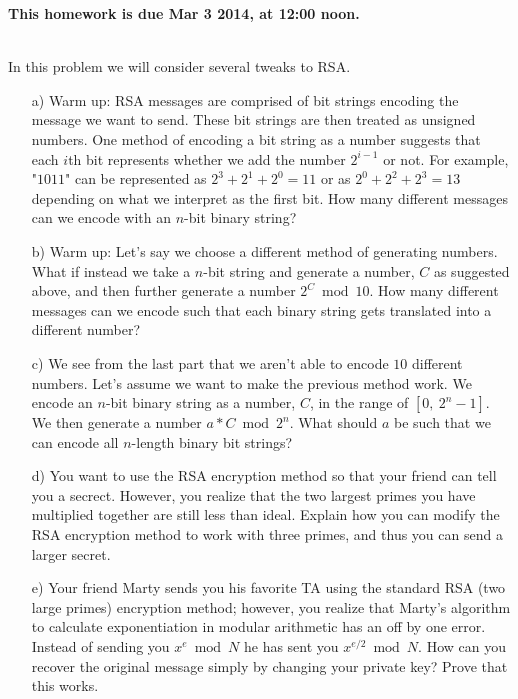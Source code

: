 \documentclass[]{article}
\begin{document}
\maketitle
{}
\vspace{0.5em}
{\Large{\textbf{This homework is due Mar 3 2014, at 12:00 noon.}}}

\begin{qunlist}
  
\\    %
In this problem we will consider several tweaks to RSA.
\begin{itemize}
\qpart
\item [a)] Warm up: RSA messages are comprised of bit strings encoding the message we want to send. These bit strings are then treated as unsigned numbers. One method of encoding a bit string as a number suggests that each $i$th bit represents whether we add the number $2^{i-1}$ or not. For example, "$1011$" can be represented as $2^3 + 2^1 + 2^0 = 11$ or as $2^0 + 2^2 + 2^3 = 13$ depending on what we interpret as the first bit. How many different messages can we encode with an $n$-bit binary string?
\qpart
\item [b)] Warm up: Let's say we choose a different method of generating numbers. What if instead we take a $n$-bit string and generate a number, $C$ as suggested above, and then further generate a number $2^C \bmod 10$. How many different messages can we encode such that each binary string gets translated into a different number?
\qpart
\item [c)] We see from the last part that we aren't able to encode $10$ different numbers. Let's assume we want to make the previous method work. We encode an $n$-bit binary string as a number, $C$, in the range of $[0, \ 2^n -1]$. We then generate a number $a*C \bmod {2^n}$. What should $a$ be such that we can encode all $n$-length binary bit strings?
\qpart
\item [d)] You want to use the RSA encryption method so that your friend can tell you a secrect. However, you realize that the two largest primes you have multiplied together are still less than ideal. Explain how you can modify the RSA encryption method to work with three primes, and thus you can send a larger secret.
\qpart
\item [e)] Your friend Marty sends you his favorite TA using the standard RSA (two large primes) encryption method; however, you realize that Marty's algorithm to calculate exponentiation in modular arithmetic has an off by one error. Instead of sending you $x^e \bmod{N}$ he has sent you $x^{e/2} \bmod{N}$. How can you recover the original message simply by changing your private key? Prove that this works.
\end{itemize}



\end{qunlist}
\end{document}
